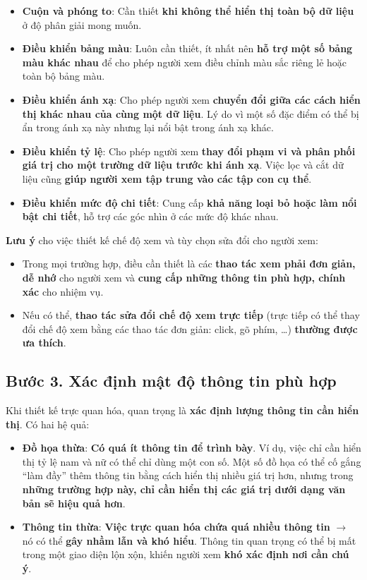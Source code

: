 \begin{itemize}
\tightlist
\item
  \textbf{Cuộn và phóng to}: Cần thiết \textbf{khi không thể hiển thị
  toàn bộ dữ liệu} ở độ phân giải mong muốn.
\item
  \textbf{Điều khiển bảng màu}: Luôn cần thiết, ít nhất nên \textbf{hỗ
  trợ một số bảng màu khác nhau} để cho phép người xem điều chỉnh màu
  sắc riêng lẻ hoặc toàn bộ bảng màu.
\item
  \textbf{Điều khiển ánh xạ}: Cho phép người xem \textbf{chuyển đổi giữa
  các cách hiển thị khác nhau của cùng một dữ liệu}. Lý do vì một số đặc
  điểm có thể bị ẩn trong ánh xạ này nhưng lại nổi bật trong ánh xạ
  khác.
\item
  \textbf{Điều khiển tỷ lệ}: Cho phép người xem \textbf{thay đổi phạm vi
  và phân phối giá trị cho một trường dữ liệu trước khi ánh xạ}. Việc
  lọc và cắt dữ liệu cũng \textbf{giúp người xem tập trung vào các tập
  con cụ thể}.
\item
  \textbf{Điều khiển mức độ chi tiết}: Cung cấp \textbf{khả năng loại bỏ
  hoặc làm nổi bật chi tiết}, hỗ trợ các góc nhìn ở các mức độ khác
  nhau.
\end{itemize}

\textbf{Lưu ý} cho việc thiết kế chế độ xem và tùy chọn sửa đổi cho
người xem:

\begin{itemize}
\tightlist
\item
  Trong mọi trường hợp, điều cần thiết là các \textbf{thao tác xem phải
  đơn giản, dễ nhớ} cho người xem và \textbf{cung cấp những thông tin
  phù hợp, chính xác} cho nhiệm vụ.
\item
  Nếu có thể, \textbf{thao tác sửa đổi chế độ xem trực tiếp} (trực tiếp
  có thể thay đổi chế độ xem bằng các thao tác đơn giản: click, gõ phím,
  \ldots) \textbf{thường được ưa thích}.
\end{itemize}

\subsection{Bước 3. Xác định mật độ thông tin phù
hợp}\label{bux1b0ux1edbc-3.-xuxe1c-ux111ux1ecbnh-mux1eadt-ux111ux1ed9-thuxf4ng-tin-phuxf9-hux1ee3p}

Khi thiết kế trực quan hóa, quan trọng là \textbf{xác định lượng thông
tin cần hiển thị}. Có hai hệ quả:

\begin{itemize}
\item
  \textbf{Đồ họa thừa}: \textbf{Có quá ít thông tin để trình bày}. Ví
  dụ, việc chỉ cần hiển thị tỷ lệ nam và nữ có thể chỉ dùng một con số.
  Một số đồ họa có thể cố gắng ``làm đầy'' thêm thông tin bằng cách hiển
  thị nhiều giá trị hơn, nhưng trong \textbf{những trường hợp này, chỉ
  cần hiển thị các giá trị dưới dạng văn bản sẽ hiệu quả hơn}.
\item
  \textbf{Thông tin thừa}: \textbf{Việc trực quan hóa chứa quá nhiều
  thông tin} \(\to\) nó có thể \textbf{gây nhầm lẫn và khó hiểu}. Thông
  tin quan trọng có thể bị mất trong một giao diện lộn xộn, khiến người
  xem \textbf{khó xác định nơi cần chú ý}.
\end{itemize}

